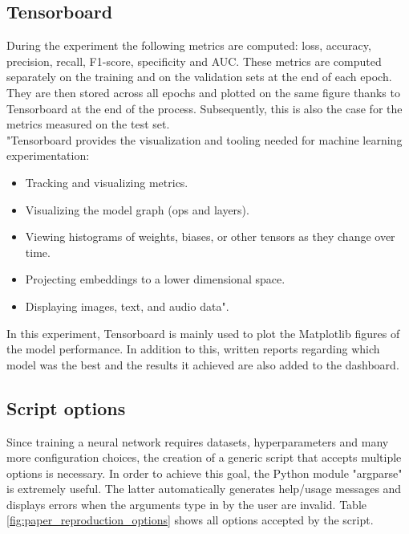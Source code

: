 \subsection{Tensorboard}
During the experiment the following metrics are computed: loss, accuracy, precision, recall, F1-score, specificity and AUC. These metrics are computed separately on the training and on the validation sets at the end of each epoch. They are then stored across all epochs and plotted on the same figure thanks to Tensorboard at the end of the process. Subsequently, this is also the case for the metrics measured on the test set.\\
"Tensorboard provides the visualization and tooling needed for machine learning experimentation:
\begin{itemize}
\item Tracking and visualizing metrics.
\item Visualizing the model graph (ops and layers).
\item Viewing histograms of weights, biases, or other tensors as they change over time.
\item Projecting embeddings to a lower dimensional space.
\item Displaying images, text, and audio data"\cite{39}.
\end{itemize}
In this experiment, Tensorboard is mainly used to plot the Matplotlib figures of the model performance. In addition to this, written reports regarding which model was the best and the results it achieved are also added to the dashboard.
\label{paper_tensorboard}


\subsection{Script options}
Since training a neural network requires datasets, hyperparameters and many more configuration choices, the creation of a generic script that accepts multiple options is necessary. In order to achieve this goal, the Python module "argparse" is extremely useful. The latter automatically generates help/usage messages and displays errors when the arguments type in by the user are invalid. Table \ref{fig:paper_reproduction_options} shows all options accepted by the script.



